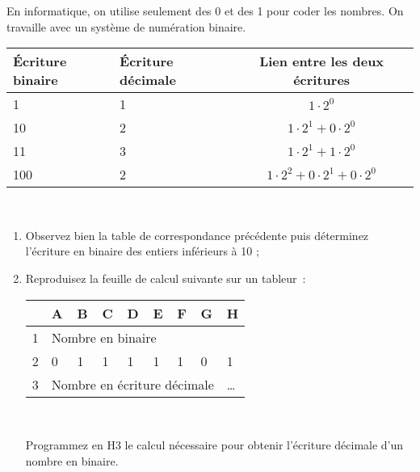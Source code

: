 \begin{TP}


En informatique, on utilise seulement des 0 et des 1 pour coder les nombres. On travaille avec un système de numération binaire.

\begin{center}
\begin{tabularx}{0.7\linewidth}{|X|X|c|}
\hline
Écriture binaire & Écriture décimale & Lien entre les deux écritures \\ \hline
1 & 1 & $1\cdot 2^0$ \\ \hline
10 & 2 & $1\cdot2^1+0\cdot 2^0$ \\ \hline
11 & 3 & $1\cdot2^1+1\cdot 2^0$ \\ \hline
100 & 2 & $1\cdot2^2+0\cdot 2^1+0\cdot 2^0$ \\ \hline
\end{tabularx} \\
\end{center}

\begin{enumerate}
 \item Observez bien la table de correspondance précédente puis déterminez l'écriture en binaire des entiers inférieurs à 10 ; \label{NbsEntMultDivis_engroupe}
 \item Reproduisez la feuille de calcul suivante sur un tableur : \\[1em]
 \begin{center}
 \begin{tabularx}{0.7\linewidth}{|X|X|X|X|X|X|X|X|X|}
 \hline
 \rowcolor{Gris2} & A & B & C & D & E & F & G & H \\ \hline
 \cellcolor{Gris2} 1 & \multicolumn{5}{l|}{Nombre en binaire}  & & & \\ \hline 
 \cellcolor{Gris2} 2 & 0 & 1 & 1 & 1 & 1 & 1 & 0 & 1 \\ \hline
 \cellcolor{Gris2} 3 & \multicolumn{7}{l|}{Nombre en écriture décimale} & \ldots  \\ \hline 
 \end{tabularx} \\
 \end{center}
 
 \vspace{1em}
 
 Programmez en H$3$ le calcul nécessaire pour obtenir l'écriture décimale d'un nombre en binaire.
  \end{enumerate}
  

\end{TP}
